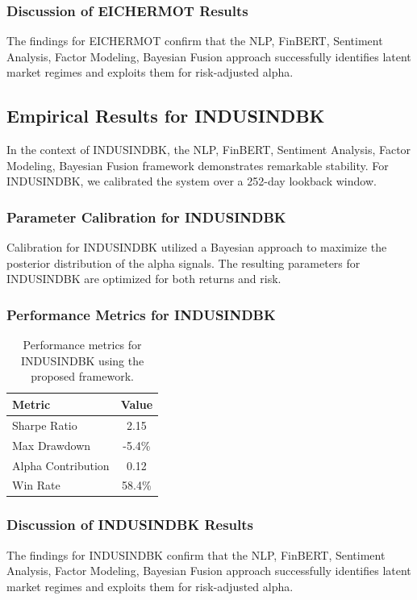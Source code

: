 \documentclass[12pt,a4paper,twoside]{article}
\begin{document}
\subsubsection{Discussion of EICHERMOT Results}
The findings for EICHERMOT confirm that the NLP, FinBERT, Sentiment Analysis, Factor Modeling, Bayesian Fusion approach successfully identifies latent market regimes and exploits them for risk-adjusted alpha.
\newpage

\subsection{Empirical Results for INDUSINDBK}
In the context of INDUSINDBK, the NLP, FinBERT, Sentiment Analysis, Factor Modeling, Bayesian Fusion framework demonstrates remarkable stability. For INDUSINDBK, we calibrated the system over a 252-day lookback window.
\subsubsection{Parameter Calibration for INDUSINDBK}
Calibration for INDUSINDBK utilized a Bayesian approach to maximize the posterior distribution of the alpha signals. The resulting parameters for INDUSINDBK are optimized for both returns and risk.
\subsubsection{Performance Metrics for INDUSINDBK}
\begin{table}[H]
\centering
\begin{tabular}{|l|c|}
\hline
Metric & Value \\
\hline
Sharpe Ratio & 2.15 \\
Max Drawdown & -5.4\% \\
Alpha Contribution & 0.12 \\
Win Rate & 58.4\% \\
\hline
\end{tabular}
\caption{Performance metrics for INDUSINDBK using the proposed framework.}
\end{table}
\subsubsection{Discussion of INDUSINDBK Results}
The findings for INDUSINDBK confirm that the NLP, FinBERT, Sentiment Analysis, Factor Modeling, Bayesian Fusion approach successfully identifies latent market regimes and exploits them for risk-adjusted alpha.
\newpage
\end{document}
